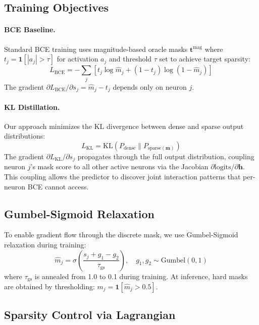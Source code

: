 \documentclass[11pt,a4paper]{article}
\begin{document}
\subsection{Training Objectives}

\paragraph{BCE Baseline.}
Standard BCE training uses magnitude-based oracle masks $\mathbf{t}^{\text{mag}}$ where $t_j = \mathbf{1}[|a_j| > \tau]$ for activation $a_j$ and threshold $\tau$ set to achieve target sparsity:
\begin{equation}
L_{\text{BCE}} = -\sum_j \left[ t_j \log \hat{m}_j + (1 - t_j) \log(1 - \hat{m}_j) \right]
\end{equation}
The gradient $\partial L_{\text{BCE}}/\partial s_j = \hat{m}_j - t_j$ depends only on neuron $j$.

\paragraph{KL Distillation.}
Our approach minimizes the KL divergence between dense and sparse output distributions:
\begin{equation}
L_{\text{KL}} = \text{KL}(P_{\text{dense}} \| P_{\text{sparse}(\mathbf{m})})
\end{equation}
The gradient $\partial L_{\text{KL}}/\partial s_j$ propagates through the full output distribution, coupling neuron $j$'s mask score to all other active neurons via the Jacobian $\partial \text{logits}/\partial \mathbf{h}$.
This coupling allows the predictor to discover joint interaction patterns that per-neuron BCE cannot access.

\subsection{Gumbel-Sigmoid Relaxation}

To enable gradient flow through the discrete mask, we use Gumbel-Sigmoid relaxation during training:
\begin{equation}
\hat{m}_j = \sigma\left(\frac{s_j + g_1 - g_2}{\tau_{\text{gs}}}\right), \quad g_1, g_2 \sim \text{Gumbel}(0,1)
\end{equation}
where $\tau_{\text{gs}}$ is annealed from 1.0 to 0.1 during training.
At inference, hard masks are obtained by thresholding: $m_j = \mathbf{1}[\hat{m}_j > 0.5]$.

\subsection{Sparsity Control via Lagrangian}
\end{document}
